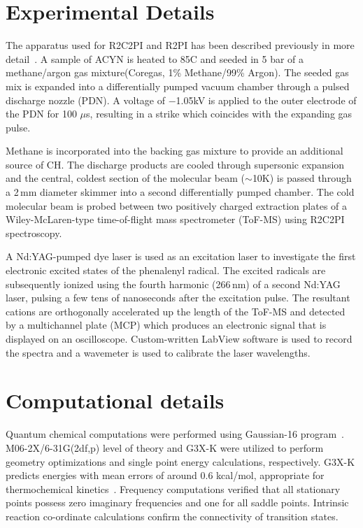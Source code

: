\documentclass[journal=jacsat,manuscript=article,layout=onecolumn]{achemso}
\begin{document}
\section{Experimental Details}

The apparatus used for R2C2PI and R2PI has been described previously in more detail~\cite{rei09}. A sample of ACYN is heated to 85\degree C and seeded in 5 bar of a methane/argon gas mixture(Coregas, 1\% Methane/99\% Argon). The seeded gas mix is expanded into a differentially pumped vacuum chamber through a pulsed discharge nozzle (PDN). A voltage of $-$1.05kV is applied to the outer electrode of the PDN for 100 $\mu$s, resulting in a strike which coincides with the expanding gas pulse.

Methane is incorporated into the backing gas mixture to provide an additional source of CH. The discharge products are cooled through supersonic expansion and the central, coldest section of the molecular beam ($\sim$10K) is passed through a 2\,mm diameter skimmer into a second differentially pumped chamber. The cold molecular beam is probed between two positively charged extraction plates of a Wiley-McLaren-type time-of-flight mass spectrometer (ToF-MS) using R2C2PI spectroscopy.

A Nd:YAG-pumped dye laser is used as an excitation laser to investigate the first electronic excited states of the phenalenyl radical. The excited radicals are subsequently ionized using the fourth harmonic (266\,nm) of a second Nd:YAG laser, pulsing a few tens of nanoseconds after the excitation pulse. The resultant cations are orthogonally accelerated up the length of the ToF-MS and detected by a multichannel plate (MCP) which produces an electronic signal that is displayed on an oscilloscope. Custom-written LabView software is used to record the spectra and a wavemeter is used to calibrate the laser wavelengths.

\section{Computational details}
Quantum chemical computations were performed using Gaussian-16 program~\cite{g16}. M06-2X/6-31G(2df,p) level of theory and G3X-K were utilized to perform geometry optimizations and single point energy calculations, respectively. G3X-K predicts energies with mean errors of around 0.6 kcal/mol, appropriate for thermochemical kinetics~\cite{das13}. Frequency computations verified that all stationary points possess zero imaginary frequencies and one for all saddle points. Intrinsic reaction co-ordinate calculations confirm the connectivity of transition states.
\end{document}
